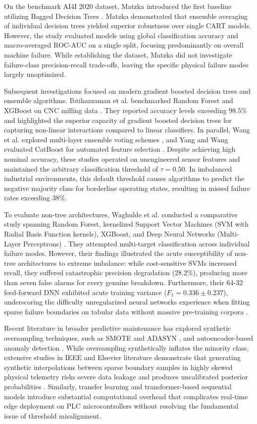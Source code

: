 \documentclass[conference]{IEEEtran}
\begin{document}
On the benchmark AI4I 2020 dataset, Matzka introduced the first baseline utilizing Bagged Decision Trees \cite{b5}. Matzka demonstrated that ensemble averaging of individual decision trees yielded superior robustness over single CART models. However, the study evaluated models using global classification accuracy and macro-averaged ROC-AUC on a single split, focusing predominantly on overall machine failure. While establishing the dataset, Matzka did not investigate failure-class precision-recall trade-offs, leaving the specific physical failure modes largely unoptimized.

Subsequent investigations focused on modern gradient boosted decision trees and ensemble algorithms. Ibtihazzaman et al. benchmarked Random Forest and XGBoost on CNC milling data \cite{b6, b7}. They reported accuracy levels exceeding $98.5\%$ and highlighted the superior capacity of gradient boosted decision trees for capturing non-linear interactions compared to linear classifiers. In parallel, Wang et al. explored multi-layer ensemble voting schemes \cite{b8}, and Yang and Wang evaluated CatBoost for automated feature selection \cite{b9}. Despite achieving high nominal accuracy, these studies operated on unengineered sensor features and maintained the arbitrary classification threshold of $\tau = 0.50$. In imbalanced industrial environments, this default threshold causes algorithms to predict the negative majority class for borderline operating states, resulting in missed failure rates exceeding $38\%$.

To evaluate non-tree architectures, Waghulde et al. conducted a comparative study spanning Random Forest, kernelized Support Vector Machines (SVM with Radial Basis Function kernels), XGBoost, and Deep Neural Networks (Multi-Layer Perceptrons) \cite{b10}. They attempted multi-target classification across individual failure modes. However, their findings illustrated the acute susceptibility of non-tree architectures to extreme imbalance: while cost-sensitive SVMs increased recall, they suffered catastrophic precision degradation ($28.2\%$), producing more than seven false alarms for every genuine breakdown. Furthermore, their 64-32 feed-forward DNN exhibited acute training variance ($F_1 = 0.336 \pm 0.237$), underscoring the difficulty unregularized neural networks experience when fitting sparse failure boundaries on tabular data without massive pre-training corpora \cite{b11, b12}.

Recent literature in broader predictive maintenance has explored synthetic oversampling techniques, such as SMOTE and ADASYN \cite{b13, b14}, and autoencoder-based anomaly detection \cite{b15, b16}. While oversampling synthetically inflates the minority class, extensive studies in IEEE and Elsevier literature demonstrate that generating synthetic interpolations between sparse boundary samples in highly skewed physical telemetry risks severe data leakage and produces uncalibrated posterior probabilities \cite{b17, b18}. Similarly, transfer learning and transformer-based sequential models \cite{b19, b20} introduce substantial computational overhead that complicates real-time edge deployment on PLC microcontrollers without resolving the fundamental issue of threshold misalignment.
\end{document}
